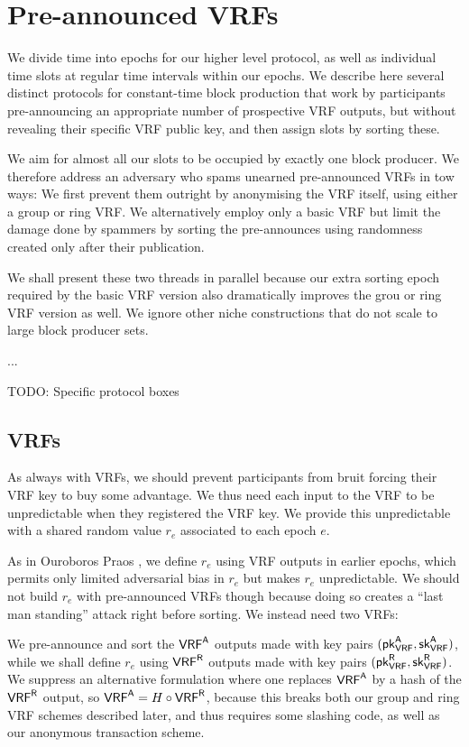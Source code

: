 
\section{Pre-announced VRFs}\label{sec:preannounced}

We divide time into epochs for our higher level protocol, as well as individual time slots at regular time intervals within our epochs.  We describe here several distinct protocols for constant-time block production that work by participants pre-announcing an appropriate number of prospective VRF outputs, but without revealing their specific VRF public key, and then assign slots by sorting these.  

We aim for almost all our slots to be occupied by exactly one block producer.  We therefore address an adversary who spams unearned pre-announced VRFs in tow ways:  We first prevent them outright by anonymising the VRF itself, using either a group or ring VRF.  We alternatively employ only a basic VRF but limit the damage done by spammers by sorting the pre-announces using randomness created only after their publication.

We shall present these two threads in parallel because our extra sorting epoch required by the basic VRF version also dramatically improves the grou or ring VRF version as well.  We ignore other niche constructions that do not scale to large block producer sets. 

...

TODO: Specific protocol boxes


\subsection{VRFs}

As always with VRFs, we should prevent participants from bruit forcing their VRF key to buy some advantage.  We thus need each input to the VRF to be unpredictable when they registered the VRF key.  We provide this unpredictable with a shared random value $r_e$ associated to each epoch $e$.  

As in Ouroboros Praos \cite{Praos}, we define $r_e$ using VRF outputs in earlier epochs, which permits only limited adversarial bias in $r_e$ but makes $r_e$ unpredictable.  We should not build $r_e$ with pre-announced VRFs though because doing so creates a ``last man standing'' attack right before sorting.  We instead need two VRFs:  

We pre-announce and sort the $\mathsf{VRF}^{\mathsf{A}}$ outputs made with key pairs $(\mathsf{pk}_{\mathsf{VRF}}^{\mathsf{A}},\mathsf{sk}_{\mathsf{VRF}}^{\mathsf{A}})$, while we shall define $r_e$ using $\mathsf{VRF}^{\mathsf{R}}$ outputs made with key pairs $(\mathsf{pk}_{\mathsf{VRF}}^{\mathsf{R}},\mathsf{sk}_{\mathsf{VRF}}^{\mathsf{R}})$.  We suppress an alternative formulation where one replaces $\mathsf{VRF}^{\mathsf{A}}$ by a hash of the $\mathsf{VRF}^{\mathsf{R}}$ output, so $\mathsf{VRF}^{\mathsf{A}} = H \circ \mathsf{VRF}^{\mathsf{R}}$, because this breaks both our group and ring VRF schemes described later, and thus requires some slashing code, as well as our anonymous transaction scheme.

